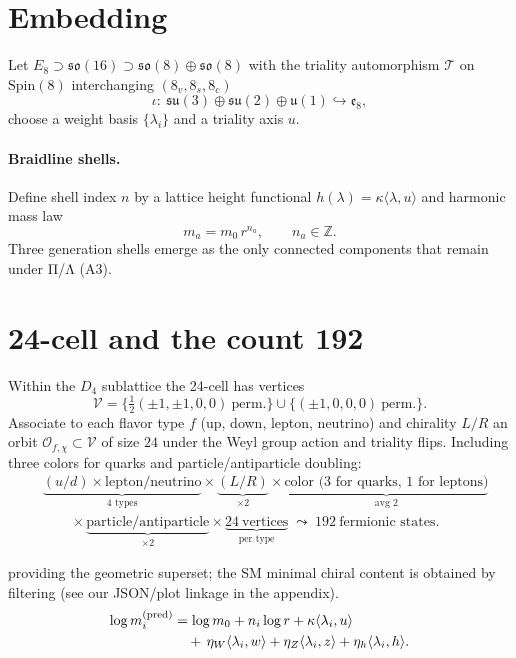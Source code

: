 \section{Embedding}
Let $E_8\supset \mathfrak{so}(16)\supset \mathfrak{so}(8)\oplus\mathfrak{so}(8)$ with the triality automorphism $\mathcal{T}$ on $\mathrm{Spin}(8)$ interchanging $(8_v,8_s,8_c)$
\[
\iota:\ \mathfrak{su}(3)\oplus\mathfrak{su}(2)\oplus\mathfrak{u}(1)\hookrightarrow \mathfrak{e}_8,
\]
choose a weight basis $\{\lambda_i\}$ and a triality axis $u$.

\paragraph{Braidline shells.}
Define shell index $n$ by a lattice height functional $h(\lambda)=\kappa\langle \lambda,u\rangle$ and harmonic mass law
\[
m_a=m_0\,r^{n_a},\qquad n_a\in\mathbb{Z}.
\]
Three generation shells emerge as the only connected components that remain under Π/Λ (A3).

\section{24-cell and the count 192}
Within the $D_4$ sublattice the 24-cell has vertices
\[
\mathcal{V}=\Big\{\tfrac{1}{2}(\pm1,\pm1,0,0)\ \text{perm.}\Big\}\cup\{(\pm1,0,0,0)\ \text{perm.}\}.
\]
Associate to each flavor type $f$ (up, down, lepton, neutrino) and chirality $L/R$ an orbit $\mathcal{O}_{f,\chi}\subset\mathcal{V}$ of size $24$ under the Weyl group action and triality flips. Including three colors for quarks and particle/antiparticle doubling:
\begin{align}
&\underbrace{(u/d)\times \text{lepton/neutrino}}_{\text{4 types}}
  \times \underbrace{(L/R)}_{\times 2}
  \times \underbrace{\text{color (3 for quarks, 1 for leptons)}}_{\text{avg }2}
\\[-2pt]
&\qquad\times \underbrace{\text{particle/antiparticle}}_{\times 2}
  \times \underbrace{24\ \text{vertices}}_{\text{per type}}
  \;\leadsto\; 192\ \text{fermionic states}.
\label{eq:count-192}
\end{align}

providing the geometric superset; the SM minimal chiral content is obtained by filtering (see our JSON/plot linkage in the appendix).
\begin{align}
\log m_i^{\mathrm{(pred)}} &=
\log m_0 + n_i \log r + \kappa\langle \lambda_i, u\rangle \notag\\
&\quad +\, \eta_W \langle \lambda_i, w\rangle
      + \eta_Z \langle \lambda_i, z\rangle
      + \eta_h \langle \lambda_i, h\rangle . 
\label{eq:e8-alignment}
\end{align}
